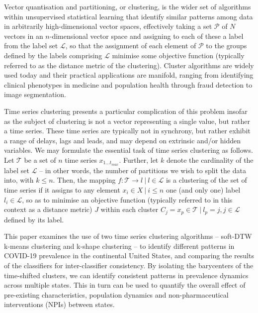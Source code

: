 \documentclass{article}
\begin{document}
Vector quantisation and partitioning, or clustering, is the wider set of algorithms within unsupervised statistical learning that identify similar patterns among data in arbitrarily high-dimensional vector spaces, effectively taking a set $\mathcal{P}$ of $N$ vectors in an $n$-dimensional vector space and assigning to each of these a label from the label set $\mathcal{L}$, so that the assignment of each element of $\mathcal{P}$ to the groups defined by the labels comprising $\mathcal{L}$ minimise some objective function (typically referred to as the distance metric of the clustering). Cluster algorithms are widely used today and their practical applications are manifold, ranging from identifying clinical phenotypes in  medicine and population health\cite{ahmad2014clinical,haldar2008cluster,lochner2005cluster,weatherall2009distinct,ye2014different} through fraud detection\cite{behera2015credit,liu2013healthcare,peng2006application,sabau2012survey,subudhi2017use} to image segmentation.\cite{chuang2006fuzzy,coleman1979image,jin2018accelerating,lafata2018data,pappas1989adaptive,wu1993optimal}

Time series clustering presents a particular complication of this problem insofar as the subject of clustering is not a vector representing a single value, but rather a time series. These time series are typically not in synchrony, but rather exhibit a range of delays, lags and leads, and may depend on extrinsic and/or hidden variables. We may formulate the essential task of time series clustering as follows. Let $\mathcal{T}$ be a set of $n$ time series $x_{1 \ldots t_{max}}$. Further, let $k$ denote the cardinality of the label set $\mathcal{L}$ -- in other words, the number of partitions we wish to split the data into, with $k \leq n$. Then, the mapping $f: \mathcal{T} \rightarrow l \ | \ l \in \mathcal{L}$ is a clustering of the set of time series if it assigns to any element $x_i \in X \ | \ i \leq n$ one (and only one) label $l_i \in \mathcal{L}$, so as to minimise an objective function (typically referred to in this context as a distance metric) $J$ within each cluster $C_j = {x_p \in \mathcal{T} \ | \ l_p = j, j \in \mathcal{L}}$ defined by its label.

This paper examines the use of two time series clustering algorithms -- soft-DTW k-means clustering and k-shape clustering -- to identify different patterns in COVID-19 prevalence in the continental United States, and comparing the results of the classifiers for inter-classifier consistency. By isolating the barycenters of the time-shifted clusters, we can identify consistent patterns in prevalence dynamics across multiple states. This in turn can be used to quantify the overall effect of pre-existing characteristics, population dynamics and non-pharmaceutical interventions (NPIs) between states.
\end{document}
